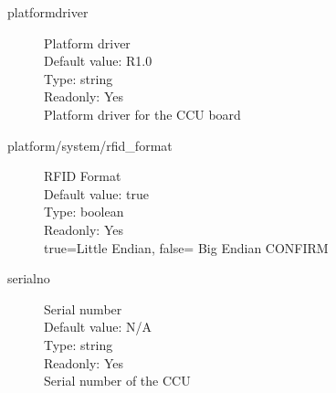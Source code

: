 \begin{description}
\item[platformdriver] Platform driver\\
  Default value: R1.0\\
  Type: string\\
  Readonly: Yes\\
  Platform driver for the CCU board\\

\item[platform/system/rfid\_format] RFID Format\\
  Default value: true\\
  Type: boolean\\
  Readonly: Yes\\
  true=Little Endian, false= Big Endian CONFIRM\\

\item[serialno] Serial number\\
  Default value: N/A\\
  Type: string\\
  Readonly: Yes\\
  Serial number of the CCU\\

\end{description}

